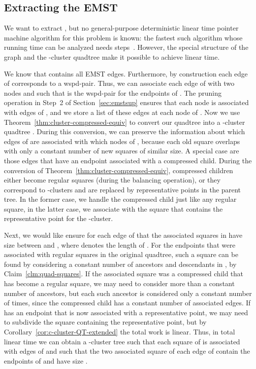 \documentclass[11pt]{paper}
\begin{document}
\subsection {Extracting the EMST}
  We want to extract , but no general-purpose deterministic linear 
  time pointer machine algorithm for this problem is known:
  the fastest such algorithm whose running time can be analyzed
  needs  steps~\cite {Chazelle00}.
  However, the special structure of the graph  and the -cluster quadtree
   make it possible to achieve linear time.

  We know that   contains all EMST edges.
  Furthermore, by construction each edge of  corresponds
  to a wspd-pair. Thus, we can associate each edge 
  of  with two nodes  and  such that  is
  the wspd-pair for the endpoints of . The pruning operation in
  Step~2 of Section~\ref{sec:emstsup} ensures that each
  node is associated with  edges of , and we store
  a list of these edges at each node of .
  Now we use Theorem~\ref{thm:cluster-compressed-equiv}
  to convert our quadtree into a -cluster quadtree .
  During this conversion, we can preserve the information
  about which edges of  are associated with which 
  nodes of , because each old square overlaps with 
  only a constant number of new squares of similar
  size. A special case are those edges that have an
  endpoint associated with a compressed child.
  During the conversion of Theorem~\ref{thm:cluster-compressed-equiv},
  compressed children either become regular squares (during the balancing
  operation), or they correspond to -clusters and are replaced
  by representative points in the parent tree. In the former case,
  we handle the compressed child just like any regular square, in the latter
  case, we associate  with the square that contains the representative
  point for the -cluster.
  
  Next, we would like ensure for each edge  of  that the associated
  squares in  have size between  and , where
   denotes the length of . 
  For the endpoints that were associated with regular squares in the
  original quadtree, such a square can be found by considering a constant 
  number of ancestors and descendants in , by 
  Claim~\ref{clm:quad-squares}.  If the associated square was a compressed
  child that has become a regular square, we may need to consider more than
  a constant number of ancestors, but each such ancestor is considered only
  a constant number of times, since the compressed child has a 
  constant number of associated edges. If  has an endpoint 
  that is now associated with a representative point, we may need to subdivide
  the square containing the representative point, but by 
  Corollary~\ref{cor:c-cluster-QT-extended} the total work is linear.
  Thus, in total linear time we can obtain a -cluster
  tree  such that each square of  is associated with 
  edges of  and such that the two associated square of each 
  edge  of   contain the endpoints of  and have size
  . 
\end{document}
